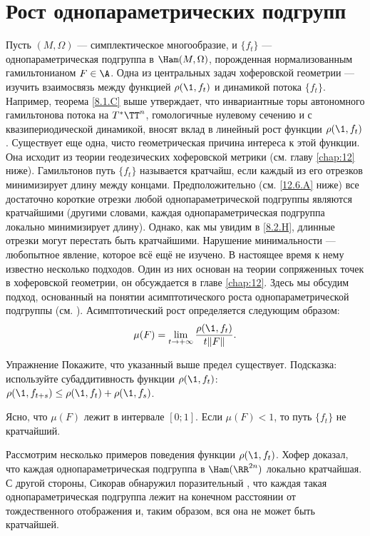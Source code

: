 \section{Рост однопараметрических подгрупп}
Пусть $(M, \Omega)$ --- симплектическое многообразие, и $\{f_t\}$ ---
однопараметрическая подгруппа в $\Ham (M, \Omega)$, порожденная
нормализованным гамильтонианом $F \in \A$. 
Одна из центральных задач хоферовской геометрии --- изучить
взаимосвязь между функцией $\rho (\1, f_t)$ и динамикой потока
$\{f_t\}$.
Например, теорема \ref{8.1.C} выше утверждает, что инвариантные торы
автономного гамильтонова потока на $T^\ast \TT^n$,  гомологичные
нулевому сечению и с квазипериодической динамикой, вносят вклад в
линейный рост функции $\rho (\1, f_t)$. 
Существует еще одна, чисто геометрическая причина интереса к этой функции.
Она исходит из теории геодезических хоферовской метрики (см. главу
\ref{chap:12} ниже). 
Гамильтонов путь $\{f_t\}$ называется кратчайш, если
каждый из его отрезков минимизирует длину между  концами. 
Предположительно (см. \ref{12.6.A} ниже) все достаточно короткие
отрезки любой однопараметрической подгруппы являются кратчайшими
(другими словами, каждая однопараметрическая подгруппа локально
минимизирует длину). 
Однако, как мы увидим в \ref{8.2.H}, длинные отрезки могут перестать
быть кратчайшими. 
Нарушение минимальности --- любопытное явление, которое всё ещё не изучено.
В настоящее время к нему известно несколько подходов.
Один из них основан на теории сопряженных точек в хоферовской
геометрии, он обсуждается в главе \ref{chap:12}. 
Здесь мы обсудим подход, основанный на понятии асимптотического роста
однопараметрической подгруппы (см. \cite{BP2}). 
Асимптотический рост определяется следующим образом:
\[\mu(F)=\lim_{t \to + \infty}\frac{\rho (\1, f_t)}{ t \| F \|}.\]

\begin{thm*}{Упражнение}
  Покажите, что указанный выше предел существует.
  Подсказка: используйте субаддитивность функции $\rho (\1, f_t)$:
  $\rho (\1, f_{t + s}) \le \rho (\1, f_t) + \rho (\1, f_s)$. 
\end{thm*}

Ясно, что $\mu (F)$ лежит в интервале $[0; 1]$.
Если $\mu (F) <1$, то путь $\{f_t\}$ не кратчайший.

Рассмотрим несколько примеров поведения функции $\rho (\1, f_t)$.
Хофер \cite{H2} доказал, что каждая однопараметрическая подгруппа в
$\Ham (\RR^{2n})$ локально кратчайшая. 
С другой стороны, Сикорав \cite{S2} обнаружил поразительный
, что каждая такая
однопараметрическая подгруппа лежит на конечном расстоянии от
тождественного отображения и, таким образом, вся она не может быть
кратчайшей. 

